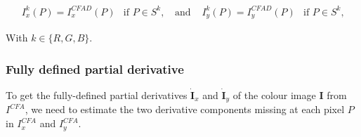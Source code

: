 \documentclass[twoside]{article}
\newcommand\D{I^{CFAD}} %
\begin{document}
\begin{equation}
\begin{array}{lclcl}
I^k_x(P) = \D_x(P)  & \text{if $P \in S^{k}$,} & \text{ and } & I^k_y(P) = \D_y(P) & \text{if $P \in S^{k}$,}
\end{array}
\label{eq:cfa_derivatives_deriche}
\end{equation}

With $k \in \{R,G,B\}$.





\subsubsection{Fully defined partial derivative}
To get the fully-defined partial derivatives $\dot{\textbf{I}}_x$ and $\dot{\textbf{I}}_y$ of the colour image $\mathbf{I}$ from $I^{CFA}$, we need to estimate the two derivative components missing at each pixel $P$ in $I^{CFA}_x$ and $I^{CFA}_y$.
\end{document}
